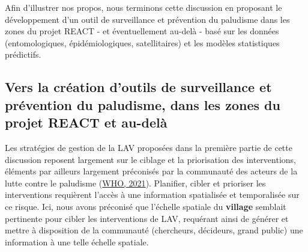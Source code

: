 \documentclass[12pt,twoside]{reedthesis}
\begin{document}
Afin d'illustrer nos propos, nous terminons cette discussion en proposant le développement d'un outil de surveillance et prévention du paludisme dans les zones du projet REACT - et éventuellement au-delà - basé sur les données (entomologiques, épidémiologiques, satellitaires) et les modèles statistiques prédictifs.

\hypertarget{surveillance-prevention-tools}{%
\subsection{Vers la création d'outils de surveillance et prévention du paludisme, dans les zones du projet REACT et au-delà}\label{surveillance-prevention-tools}}

Les stratégies de gestion de la LAV proposées dans la première partie de cette discussion reposent largement sur le ciblage et la priorisation des interventions, éléments par ailleurs largement préconisés par la communauté des acteurs de la lutte contre le paludisme (\protect\hyperlink{ref-who_2021}{WHO, 2021}). Planifier, cibler et prioriser les interventions requièrent l'accès à une information spatialisée et temporalisée sur ce risque. Ici, nous avons préconisé que l'échelle spatiale du \textbf{village} semblait pertinente pour cibler les interventions de LAV, requérant ainsi de générer et mettre à disposition de la communauté (chercheurs, décideurs, grand public) une information à une telle échelle spatiale.\\
\end{document}
